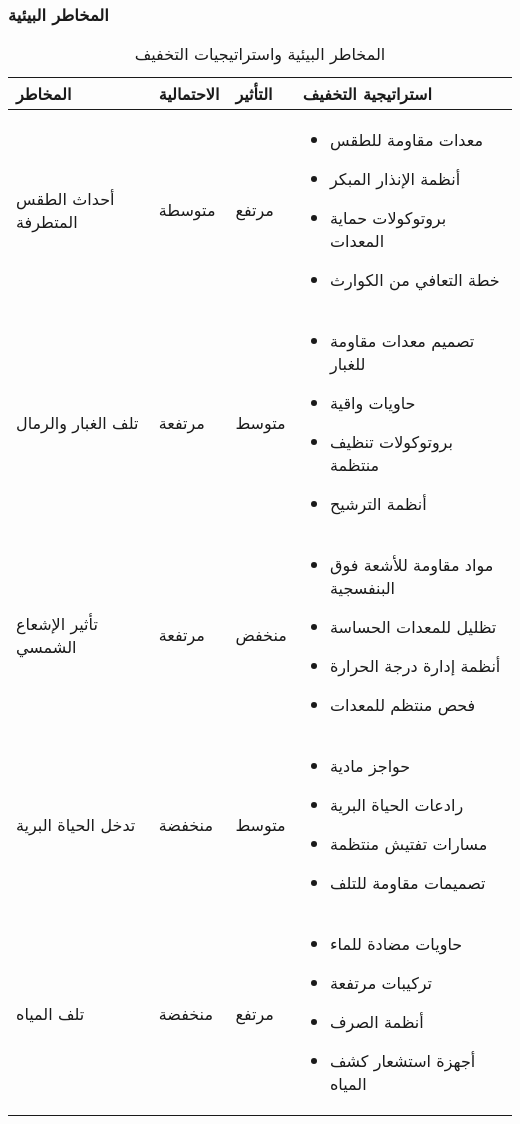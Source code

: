 \subsubsection{المخاطر البيئية}
\begin{table}[H]
\centering
\begin{tabular}{|p{3cm}|p{2cm}|p{2cm}|p{7cm}|}
\hline
\textbf{المخاطر} & \textbf{الاحتمالية} & \textbf{التأثير} & \textbf{استراتيجية التخفيف} \\
\hline
أحداث الطقس المتطرفة & متوسطة & مرتفع & 
\begin{itemize}
    \item معدات مقاومة للطقس
    \item أنظمة الإنذار المبكر
    \item بروتوكولات حماية المعدات
    \item خطة التعافي من الكوارث
\end{itemize} \\
\hline
تلف الغبار والرمال & مرتفعة & متوسط & 
\begin{itemize}
    \item تصميم معدات مقاومة للغبار
    \item حاويات واقية
    \item بروتوكولات تنظيف منتظمة
    \item أنظمة الترشيح
\end{itemize} \\
\hline
تأثير الإشعاع الشمسي & مرتفعة & منخفض & 
\begin{itemize}
    \item مواد مقاومة للأشعة فوق البنفسجية
    \item تظليل للمعدات الحساسة
    \item أنظمة إدارة درجة الحرارة
    \item فحص منتظم للمعدات
\end{itemize} \\
\hline
تدخل الحياة البرية & منخفضة & متوسط & 
\begin{itemize}
    \item حواجز مادية
    \item رادعات الحياة البرية
    \item مسارات تفتيش منتظمة
    \item تصميمات مقاومة للتلف
\end{itemize} \\
\hline
تلف المياه & منخفضة & مرتفع & 
\begin{itemize}
    \item حاويات مضادة للماء
    \item تركيبات مرتفعة
    \item أنظمة الصرف
    \item أجهزة استشعار كشف المياه
\end{itemize} \\
\hline
\end{tabular}
\caption{المخاطر البيئية واستراتيجيات التخفيف}
\end{table}

